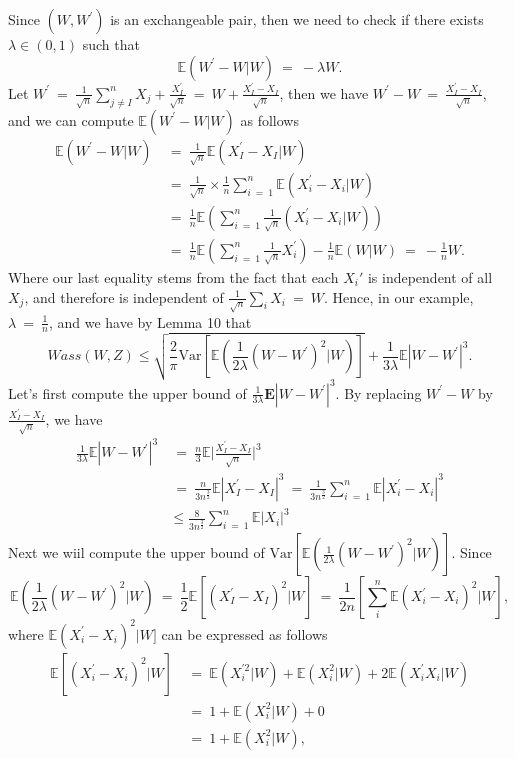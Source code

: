 \documentclass[12pt]{article}
\newcommand{\eq }{\: = \:}
\theoremstyle{nonumberplain}
\begin{document}
Since $(W, W^{\prime})$ is an exchangeable pair, then we need to check  if there exists $\lambda \in (0,1)$ such that
$$
\mathbb{E}(W^{\prime}-W|W)\eq -\lambda W.
$$
Let $W^{\prime}\eq \frac{1}{\sqrt{n}} \sum_{j\neq I}^{n} X_{j}+\frac{X_{I}^{\prime}} {\sqrt{n}}\eq W+\frac{X_{I}^{\prime}-X_{I}}{\sqrt{n}}$, then we have $W^{\prime}-W\eq \frac{X_{I}^{\prime}-X_{I}}{\sqrt{n}}$, and we can compute $\mathbb{E}(W^{\prime}-W|W)$ as follows
\begin{align*}
\mathbb{E}(W^{\prime}-W|W)&\eq \frac{1}{\sqrt{n}} \mathbb{E}(X_{I}^{\prime}-X_{I}|W)\\
&\eq \frac{1}{\sqrt{n}}\times \frac{1}{n} \sum_{i\eq 1}^{n} \mathbb{E}(X_{i}^{\prime}-X_{i}|W)\\
&\eq \frac{1}{n} \mathbb{E}(\sum_{i\eq 1}^{n} \frac{1}{\sqrt{n}} (X_{i}^{\prime}-X_{i}|W))\\
&\eq \frac{1}{n} \mathbb{E}(\sum_{i\eq 1}^{n} \frac{1}{\sqrt{n}} X_{i}^{\prime})-\frac{1}{n} \mathbb{E}(W|W)\eq -\frac{1}{n} W.
\end{align*}
Where our last equality stems from the fact that each $X_i'$ is independent of all $X_j$, and therefore is independent of $\frac{1}{\sqrt n} \sum_i X_i \eq W$. Hence, in our example, $\lambda \eq  \frac{1}{n}$, and we have by Lemma 10 that
$$
Wass(W,Z)\leq \sqrt{\frac{2}{\pi} \mathrm{Var}[\mathbb{E}(\frac{1}{2\lambda}(W-W^{\prime})^{2}|W)]}+\frac{1}{3\lambda} \mathbb{E}|W-W^{\prime}|^{3}.
$$
Let's first compute the upper bound of $\frac{1}{3\lambda} \mathbf{E}|W-W^{\prime}|^{3}$. By replacing $W^{\prime}-W$ by $ \frac{X_{I}^{\prime}-X_{I}}{\sqrt{n}}$, we have
\begin{align*}
\frac{1}{3\lambda} \mathbb{E}|W-W^{\prime}|^{3}&\eq \frac{n}{3} \mathbb{E} \biggr| \frac{X_{I}^{\prime}-X_{I}}{\sqrt{n}} \biggr|^{3}\\
&\eq \frac{n}{3n^{\frac{3}{2}}} \mathbb{E}|X_{I}^{\prime}-X_{I}|^{3}\eq \frac{1}{3n^{\frac{3}{2}}} \sum_{i\eq 1}^{n} \mathbb{E}|X_{i}^{\prime}-X_{i}|^{3}\\
&\leq \frac{8}{3n^{\frac{3}{2}}} \sum_{i\eq 1}^{n} \mathbb{E}|X_{i}|^{3}
\end{align*}
Next we wiil compute the upper bound of $\mathrm{Var}[\mathbb{E}(\frac{1}{2\lambda}(W-W^{\prime})^{2}|W)]$. Since 
$$
\mathbb{E}(\frac{1}{2\lambda}(W-W^{\prime})^{2}|W)\eq \frac{1}{2} \mathbb{E}[(X_{I}^{\prime}-X_{I})^{2}|W]\eq \frac{1}{2n}[\sum_{i}^{n} \mathbb{E}(X_{i}^{\prime}-X_{i})^{2}|W], 
$$
where $\mathbb{E}(X_{i}^{\prime}-X_{i})^{2}|W]$ can be expressed as follows 
\begin{align*}
\mathbb{E}[(X_{i}^{\prime}-X_{i})^{2}|W]&\eq \mathbb{E}(X_{i}^{\prime 2}|W)+\mathbb{E}(X_{i}^{2}|W)+2\mathbb{E}(X_{i}^{\prime}X_{i}|W)\\
&\eq 1+\mathbb{E}(X_{i}^{2}|W)+0\\
&\eq 1+\mathbb{E}(X_{i}^{2}|W),
\end{align*}
\end{document}
